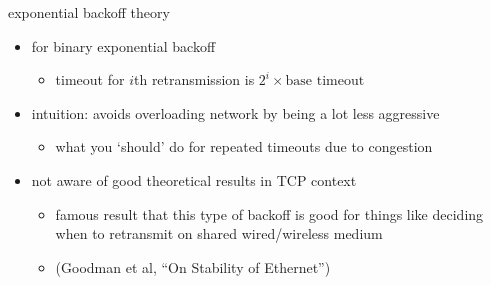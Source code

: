 \begin{frame}{exponential backoff theory}
    \begin{itemize}
    \item for binary exponential backoff 
        \begin{itemize}
        \item timeout for $i$th retransmission is $2^i \times \text{base timeout}$
        \end{itemize}
    \item intuition: avoids overloading network by being a lot less aggressive
        \begin{itemize}
        \item what you `should' do for repeated timeouts due to congestion
        \end{itemize}
    \item not aware of good theoretical results in TCP context
        \begin{itemize}
        \item famous result that this type of backoff is good for things like deciding when to retransmit on shared wired/wireless medium
        \item (Goodman et al, ``On Stability of Ethernet'')
        \end{itemize}
    \end{itemize}
\end{frame}
